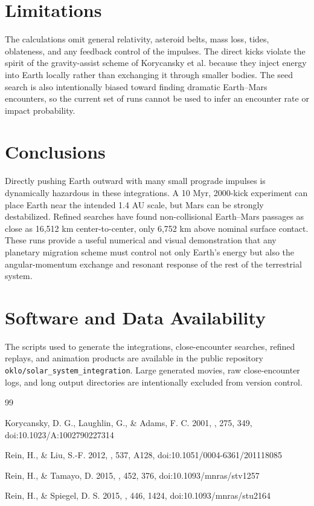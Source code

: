\documentclass[twocolumn]{aastex631}
\begin{document}
\section{Limitations}

The calculations omit general relativity, asteroid belts, mass loss, tides, oblateness, and any feedback control of the impulses.  The direct kicks violate the spirit of the gravity-assist scheme of Korycansky et al. because they inject energy into Earth locally rather than exchanging it through smaller bodies.  The seed search is also intentionally biased toward finding dramatic Earth--Mars encounters, so the current set of runs cannot be used to infer an encounter rate or impact probability.

\section{Conclusions}

Directly pushing Earth outward with many small prograde impulses is dynamically hazardous in these integrations.  A 10 Myr, 2000-kick experiment can place Earth near the intended 1.4 AU scale, but Mars can be strongly destabilized.  Refined searches have found non-collisional Earth--Mars passages as close as 16,512 km center-to-center, only 6,752 km above nominal surface contact.  These runs provide a useful numerical and visual demonstration that any planetary migration scheme must control not only Earth's energy but also the angular-momentum exchange and resonant response of the rest of the terrestrial system.

\section{Software and Data Availability}

The scripts used to generate the integrations, close-encounter searches, refined replays, and animation products are available in the public repository \texttt{oklo/solar\_system\_integration}.  Large generated movies, raw close-encounter logs, and long output directories are intentionally excluded from version control.

\begin{thebibliography}{99}

Korycansky, D. G., Laughlin, G., \& Adams, F. C. 2001, \apss, 275, 349, doi:10.1023/A:1002790227314

Rein, H., \& Liu, S.-F. 2012, \aap, 537, A128, doi:10.1051/0004-6361/201118085

Rein, H., \& Tamayo, D. 2015, \mnras, 452, 376, doi:10.1093/mnras/stv1257

Rein, H., \& Spiegel, D. S. 2015, \mnras, 446, 1424, doi:10.1093/mnras/stu2164

\end{thebibliography}
\end{document}
